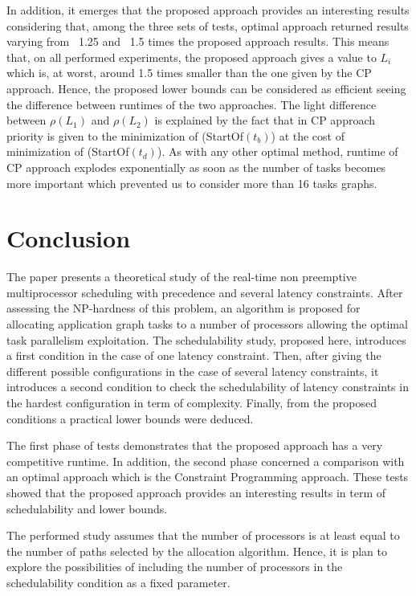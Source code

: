 \documentclass{ijcaArticle}
\begin{document}
In addition, it emerges that the proposed approach provides an interesting results considering that, among the three sets of tests,  optimal approach returned results varying from ~1.25 and ~1.5 times the proposed approach results. This means that, on all performed experiments, the proposed approach gives a value to $L_i$ which is, at worst, around 1.5 times smaller than the one given by the CP approach. Hence, the proposed lower bounds can be considered as efficient seeing the difference between runtimes of the two approaches.  The light difference between $\rho(L_1)$ and $\rho(L_2)$ is explained by the fact that in CP approach priority is given to the minimization of (StartOf$(t_b)$) at the cost of minimization of  (StartOf$(t_d)$). As with any other optimal method,  runtime of CP approach explodes exponentially  as soon as the number of tasks becomes more important which prevented us to consider more than 16 tasks graphs. 


\section{Conclusion} The paper presents a theoretical study of the real-time non preemptive multiprocessor scheduling with precedence and several latency constraints. After assessing the NP-hardness of this problem, an algorithm is proposed for allocating application graph tasks to a number of processors allowing the optimal task parallelism exploitation. 
The schedulability study, proposed here, introduces a first condition in the case of one latency constraint. Then, after giving the different possible configurations in the case of several latency constraints, it introduces a second condition to check the schedulability of latency constraints in the hardest configuration in term of complexity. Finally, from the proposed conditions a practical lower bounds were deduced.       

The first phase of tests demonstrates that the proposed approach has a very competitive runtime. In addition, the second phase concerned a comparison with an optimal approach which is the Constraint Programming approach. These tests showed that the proposed approach provides an interesting results in term of schedulability and lower bounds.     

The performed study assumes that the number of processors is at least equal to the number of paths selected by the allocation algorithm. Hence, it is plan to explore the possibilities
of including the number of processors in the schedulability condition as a fixed parameter.


    


 

\end{document}
